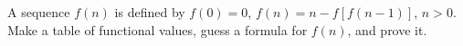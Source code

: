 A sequence $f(n)$ is defined by $f(0) = 0$, $f(n) = n - f[f(n-1)]$, $n > 0$. Make a table of functional values, guess a formula for $f(n)$, and prove it.
